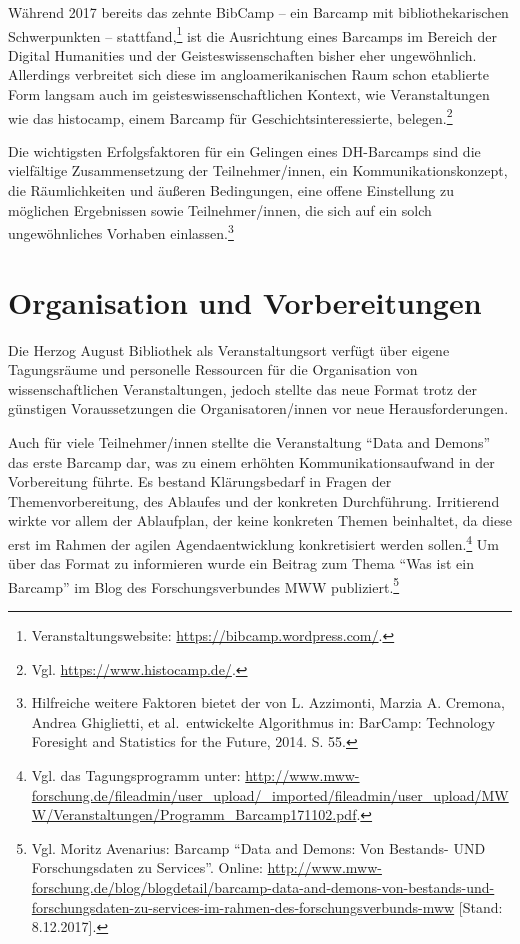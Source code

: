 \documentclass[a4paper,
fontsize=11pt,
oneside,
numbers=noperiodatend,
parskip=half-,
bibliography=totoc,
final
]{scrartcl}
\begin{document}
Während 2017 bereits das zehnte BibCamp -- ein Barcamp mit
bibliothekarischen Schwerpunkten -- stattfand,\footnote{Veranstaltungswebsite:
  \url{https://bibcamp.wordpress.com/}.} ist die Ausrichtung eines
Barcamps im Bereich der Digital Humanities und der Geisteswissenschaften
bisher eher ungewöhnlich. Allerdings verbreitet sich diese im
angloamerikanischen Raum schon etablierte Form langsam auch im
geisteswissenschaftlichen Kontext, wie Veranstaltungen wie das
histocamp, einem Barcamp für Geschichtsinteressierte, belegen.\footnote{Vgl.
  \url{https://www.histocamp.de/}.}

Die wichtigsten Erfolgsfaktoren für ein Gelingen eines DH-Barcamps sind
die vielfältige Zusammensetzung der Teilnehmer/innen, ein
Kommunikationskonzept, die Räumlichkeiten und äußeren Bedingungen, eine
offene Einstellung zu möglichen Ergebnissen sowie Teilnehmer/innen, die
sich auf ein solch ungewöhnliches Vorhaben einlassen.\footnote{Hilfreiche
  weitere Faktoren bietet der von L. Azzimonti, Marzia A. Cremona,
  Andrea Ghiglietti, et al.~entwickelte Algorithmus in: BarCamp:
  Technology Foresight and Statistics for the Future, 2014. S. 55.}

\hypertarget{organisation-und-vorbereitungen}{%
\section{Organisation und
Vorbereitungen}\label{organisation-und-vorbereitungen}}

Die Herzog August Bibliothek als Veranstaltungsort verfügt über eigene
Tagungsräume und personelle Ressourcen für die Organisation von
wissenschaftlichen Veranstaltungen, jedoch stellte das neue Format trotz
der günstigen Voraussetzungen die Organisatoren/innen vor neue
Herausforderungen.

Auch für viele Teilnehmer/innen stellte die Veranstaltung \enquote{Data
and Demons} das erste Barcamp dar, was zu einem erhöhten
Kommunikationsaufwand in der Vorbereitung führte. Es bestand
Klärungsbedarf in Fragen der Themenvorbereitung, des Ablaufes und der
konkreten Durchführung. Irritierend wirkte vor allem der Ablaufplan, der
keine konkreten Themen beinhaltet, da diese erst im Rahmen der agilen
Agendaentwicklung konkretisiert werden sollen.\footnote{Vgl. das
  Tagungsprogramm unter:
  \url{http://www.mww-forschung.de/fileadmin/user_upload/_imported/fileadmin/user_upload/MWW/Veranstaltungen/Programm_Barcamp171102.pdf}.}
Um über das Format zu informieren wurde ein Beitrag zum Thema
\enquote{Was ist ein Barcamp} im Blog des Forschungsverbundes MWW
publiziert.\footnote{Vgl. Moritz Avenarius: Barcamp \enquote{Data and
  Demons: Von Bestands- UND Forschungsdaten zu Services}. Online:
  \url{http://www.mww-forschung.de/blog/blogdetail/barcamp-data-and-demons-von-bestands-und-forschungsdaten-zu-services-im-rahmen-des-forschungsverbunds-mww}
  {[}Stand: 8.12.2017{]}.}
\end{document}
